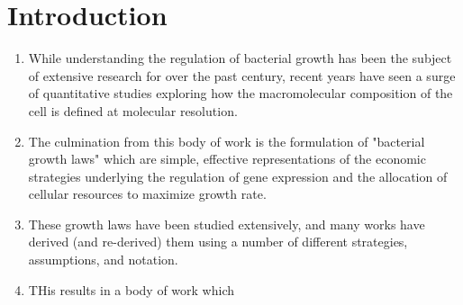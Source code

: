 \section{Introduction}
\begin{enumerate}
\item While understanding the regulation of bacterial growth has been the subject 
of extensive research for over the past century, recent years have seen a surge 
of quantitative studies exploring how the macromolecular composition of the cell 
is defined at molecular resolution. 
\item The culmination from this body of work is the formulation of "bacterial growth laws" 
which are simple, effective representations of the economic strategies underlying 
the regulation of gene expression and the allocation of cellular resources to 
maximize growth rate. 
\item These growth laws have been studied extensively, and many works have derived 
(and re-derived) them using a number of different strategies, assumptions, and notation.
\item THis results in a body of work which
\end{enumerate}